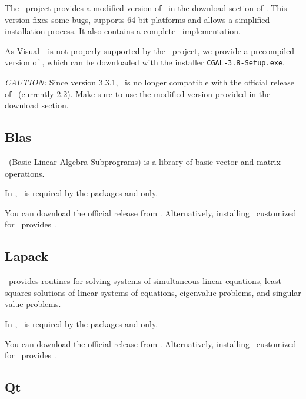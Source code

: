 The \cgal\ project provides a modified version of \taucs\ in the download
section of \cgalhomepage. This version fixes some bugs,
supports 64-bit platforms and allows a simplified installation process.
It also contains a complete \lapack\ implementation.

As Visual~\CC\ is not properly
supported by the \taucs\ project, we provide a precompiled version of
\taucs, which can be downloaded with the installer
\texttt{CGAL-3.8-Setup.exe}.

{\em CAUTION:} Since version 3.3.1, \cgal\ is no longer compatible with the official
release of \taucs\ (currently 2.2). Make sure to use the modified
version provided in the download section.



\subsection{Blas \label{thirdparty:Blas}}

\blas\ (Basic Linear Algebra Subprograms) is a library of
basic vector and matrix operations.

In \cgal, \blas\ is required by the packages
and  only.

You can download the official release from \blaspage.
Alternatively, installing \taucs\ customized for \cgal\ provides \blas.


\subsection{Lapack \label{thirdparty:Lapack}}

\lapack\ provides routines for solving systems of simultaneous linear equations,
least-squares solutions of linear systems of equations, eigenvalue problems,
and singular value problems.

In \cgal, \lapack\ is required by the packages
and  only.

You can download the official release from \lapackpage.
Alternatively, installing \taucs\ customized for \cgal\ provides \lapack.


\subsection{Qt  \label{thirdparty:Qt}}

